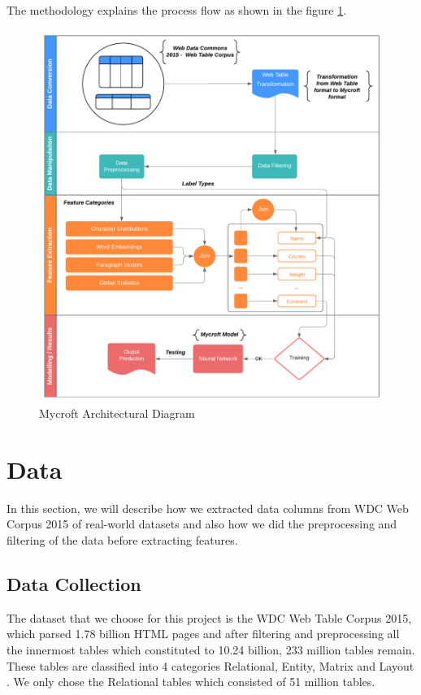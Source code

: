 \documentclass[12pt, a4paper]{report}
\theoremstyle{definition}
\numberwithin{equation}{chapter}
\numberwithin{figure}{chapter}
\numberwithin{table}{chapter}
\begin{document}
\begin{spacing}{1.5}
The methodology explains the process flow as shown in the figure \ref{fig:arcdiadram}.

\begin{figure}[h]
    \centering
    \includegraphics[width=\textwidth]{./Pics/architectural_diagram.png} 
    \caption{Mycroft Architectural Diagram}
    \label{fig:arcdiadram}
\end{figure}

\section{Data}
\label{sec:data}

In this section, we will describe how we extracted data columns from WDC Web Corpus 2015 \cite{wdc} of real-world datasets and also how we did the preprocessing and filtering of the data before extracting features.

\subsection{Data Collection}
\label{ssec:datacol}

The dataset that we choose for this project is the WDC Web Table Corpus 2015, which parsed 1.78 billion HTML pages and after filtering and preprocessing all the innermost tables which constituted to 10.24 billion, 233 million tables remain. These tables are classified into 4 categories Relational, Entity, Matrix and Layout \cite{wdc}. We only chose the Relational tables which consisted of 51 million tables.


\end{spacing}
\end{document}
